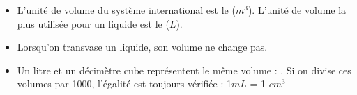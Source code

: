 \begin{mybilan}
	\begin{itemize}
		\item L'unité de volume du système international est le  ($m^3$). L'unité de volume la plus utilisée pour un liquide est le  ($L$).
		\item Lorsqu'on transvase un liquide, son volume ne change pas.
		\item Un litre et un décimètre cube représentent le même volume : . Si on divise ces volumes par \num{1000}, l'égalité est toujours vérifiée : 1$mL$ = 1 $cm^3$
	\end{itemize}
\end{mybilan}